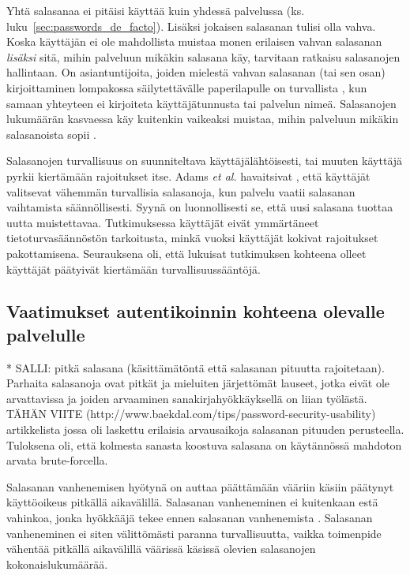 \documentclass[english,gradu]{tktltiki}
\begin{document}
         Yhtä salasanaa ei pitäisi käyttää kuin yhdessä palvelussa (ks. luku~\ref{sec:passwords_de_facto}). Lisäksi jokaisen salasanan tulisi olla vahva. Koska käyttäjän ei ole mahdollista muistaa monen erilaisen vahvan salasanan \emph{lisäksi} sitä, mihin palveluun mikäkin salasana käy, tarvitaan ratkaisu salasanojen hallintaan. On asiantuntijoita, joiden mielestä vahvan salasanan (tai sen osan) kirjoittaminen lompakossa säilytettävälle paperilapulle on turvallista \cite{fsecure_passwords_on_postit_09, microsoft_guru_write_your_password_05, schneier_changing_passwords_10, schneier_choosing_passwords_07, schneier_write_down_your_password_05}, kun samaan yhteyteen ei kirjoiteta käyttäjätunnusta tai palvelun nimeä. Salasanojen lukumäärän kasvaessa käy kuitenkin vaikeaksi muistaa, mihin palveluun mikäkin salasanoista sopii \cite{study_of_passwords_07}.

         Salasanojen turvallisuus on suunniteltava käyttäjälähtöisesti, tai muuten käyttäjä pyrkii kiertämään rajoitukset itse. Adams \emph{et al.} havaitsivat \cite{users_are_not_the_enemy_99}, että käyttäjät valitsevat vähemmän turvallisia salasanoja, kun palvelu vaatii salasanan vaihtamista säännöllisesti. Syynä on luonnollisesti se, että uusi salasana tuottaa uutta muistettavaa. Tutkimuksessa käyttäjät eivät ymmärtäneet tietoturvasäännöstön tarkoitusta, minkä vuoksi käyttäjät kokivat rajoitukset pakottamisena. Seurauksena oli, että lukuisat tutkimuksen kohteena olleet käyttäjät päätyivät kiertämään turvallisuussääntöjä.




\subsection{Vaatimukset autentikoinnin kohteena olevalle palvelulle}

* SALLI: pitkä salasana (käsittämätöntä että salasanan pituutta rajoitetaan). Parhaita salasanoja ovat pitkät ja mieluiten järjettömät lauseet, jotka eivät ole arvattavissa ja joiden arvaaminen sanakirjahyökkäyksellä on liian työlästä. TÄHÄN VIITE (http://www.baekdal.com/tips/password-security-usability) artikkelista jossa oli laskettu erilaisia arvausaikoja salasanan pituuden perusteella. Tuloksena oli, että kolmesta sanasta koostuva salasana on käytännössä mahdoton arvata brute-forcella.

Salasanan vanhenemisen hyötynä on auttaa päättämään vääriin käsiin päätynyt käyttöoikeus pitkällä aikavälillä. Salasanan vanheneminen ei kuitenkaan estä vahinkoa, jonka hyökkääjä tekee ennen salasanan vanhenemista \cite{lopsa_pw_expiry_06}. Salasanan vanheneminen ei siten välittömästi paranna turvallisuutta, vaikka toimenpide vähentää pitkällä aikavälillä väärissä käsissä olevien salasanojen kokonaislukumäärää.
\end{document}
